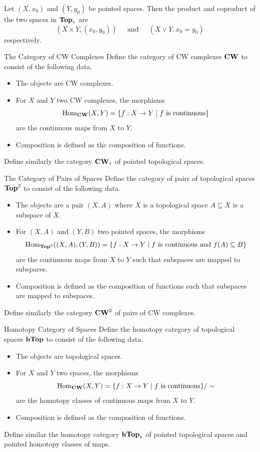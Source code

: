 \documentclass[a4paper]{article}
\begin{document}
\begin{prp}{}{} Let $(X,x_0)$ and $(Y,y_0)$ be pointed spaces. Then the product and coproduct of the two spaces in $\bold{Top}_\ast$ are $$(X\times Y,(x_0,y_0))\;\;\;\;\text{ and }\;\;\;\;(X\vee Y,x_0=y_0)$$ respectively. 
\end{prp}

\begin{defn}{The Category of CW Complexes}{} Define the category of CW complexes $\bold{CW}$ to consist of the following data. 
\begin{itemize}
\item The objects are CW complexes. 
\item For $X$ and $Y$ two CW complexes, the morphisms $$\operatorname{Hom}_{\bold{CW}}(X,Y)=\{f:X\to Y\;|\;f\text{ is continuous}\}$$ are the continuous maps from $X$ to $Y$. 
\item Composition is defined as the composition of functions. 
\end{itemize}
Define similarly the category $\bold{CW}_\ast$ of pointed topological spaces. 
\end{defn}

\begin{defn}{The Category of Pairs of Spaces}{} Define the category of pairs of topological spaces $\bold{Top}^2$ to consist of the following data. 
\begin{itemize}
\item The objects are a pair $(X,A)$ where $X$ is a topological space $A\subseteq X$ is a subspace of $X$. 
\item For $(X,A)$ and $(Y,B)$ two pointed spaces, the morphisms $$\operatorname{Hom}_{\bold{Top}^2}((X,A),(Y,B))=\{f:X\to Y\;|\;f\text{ is continuous and }f(A)\subseteq B\}$$ are the continuous maps from $X$ to $Y$ such that subspaces are mapped to subspaces. 
\item Composition is defined as the composition of functions such that subspaces are mapped to subspaces. 
\end{itemize}
Define similarly the category $\bold{CW}^2$ of pairs of CW complexes. 
\end{defn}

\begin{defn}{Homotopy Category of Spaces}{} Define the homotopy category of topological spaces $\bold{hTop}$ to consist of the following data. 
\begin{itemize}
\item The objects are topological spaces. 
\item For $X$ and $Y$ two spaces, the morphisms $$\operatorname{Hom}_{\bold{CW}}(X,Y)=\{f:X\to Y\;|\;f\text{ is continuous}\}/\sim$$ are the homotopy classes of continuous maps from $X$ to $Y$. 
\item Composition is defined as the composition of functions. 
\end{itemize}
Define similar the homotopy category $\bold{hTop}_\ast$ of pointed topological spaces and pointed homotopy classes of maps. 
\end{defn}
\end{document}
